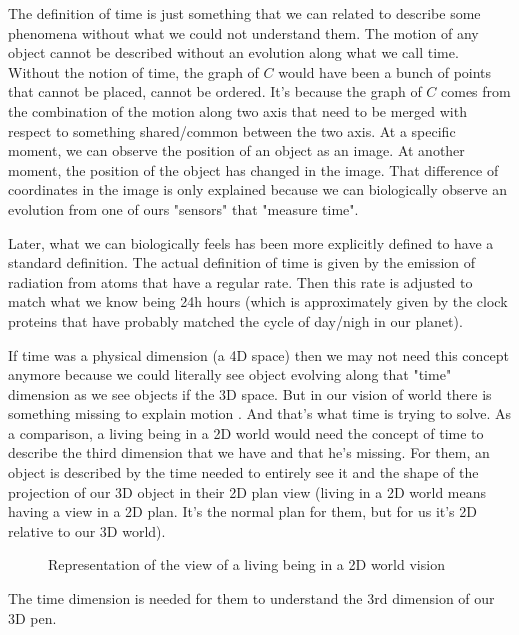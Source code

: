 \documentclass[12pt]{article}
\begin{document}
The definition of time is just something that we can related to describe some phenomena without what we could not understand them. The motion of any object cannot be described without an evolution along what we call time. Without the notion of time, the graph of $C$ would have been a bunch of points that cannot be placed, cannot be ordered. It's because the graph of $C$ comes from the combination of the motion along two axis that need to be merged with respect to something shared/common between the two axis. At a specific moment, we can observe the position of an object as an image. At another moment, the position of the object has changed in the image. That difference of coordinates in the image is only explained because we can biologically observe an evolution from one of ours "sensors" that "measure time".

Later, what we can biologically feels has been more explicitly defined to have a standard definition. The actual definition of time \cite{web_time_measure} is given by the emission of radiation \cite{wiki_international_atomic_time} from atoms that have a regular rate. Then this rate is adjusted to match what we know being 24h hours (which is approximately given by the clock proteins that have probably matched  the cycle of day/nigh in our planet).

If time was a physical dimension \cite{youtube_scilabus_time_4th_dimention} (a 4D space) then we may not need this concept anymore because we could literally see object evolving along that "time" dimension as we see objects if the 3D space. But in our vision of world there is something missing to explain motion \cite{youtube_etienne_klein_time}. And that's what time is trying to solve. As a comparison, a living being in a 2D world would need the concept of time to describe the third dimension that we have and that he's missing. For them, an object is described by the time needed to entirely see it and the shape of the projection of our 3D object in their 2D plan view (living in a 2D world means having a view in a 2D plan. It's the normal plan for them, but for us it's 2D relative to our 3D world).

\begin{figure}[H]
 \centering
 
 \caption*{Representation of the view of a living being in a 2D world vision}
\end{figure}

The time dimension is needed for them to understand the 3rd dimension of our 3D pen.
\end{document}
